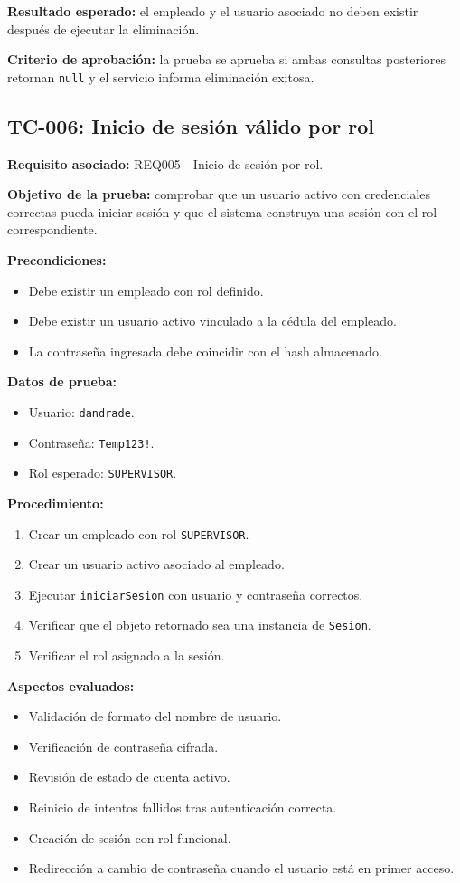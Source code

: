 \documentclass[12pt,a4paper]{article}
\begin{document}
\textbf{Resultado esperado:} el empleado y el usuario asociado no deben existir después de ejecutar la eliminación.

\textbf{Criterio de aprobación:} la prueba se aprueba si ambas consultas posteriores retornan \texttt{null} y el servicio informa eliminación exitosa.

\subsection{TC-006: Inicio de sesión válido por rol}

\textbf{Requisito asociado:} REQ005 - Inicio de sesión por rol.

\textbf{Objetivo de la prueba:} comprobar que un usuario activo con credenciales correctas pueda iniciar sesión y que el sistema construya una sesión con el rol correspondiente.

\textbf{Precondiciones:}
\begin{itemize}[leftmargin=*]
    \item Debe existir un empleado con rol definido.
    \item Debe existir un usuario activo vinculado a la cédula del empleado.
    \item La contraseña ingresada debe coincidir con el hash almacenado.
\end{itemize}

\textbf{Datos de prueba:}
\begin{itemize}[leftmargin=*]
    \item Usuario: \texttt{dandrade}.
    \item Contraseña: \texttt{Temp123!}.
    \item Rol esperado: \texttt{SUPERVISOR}.
\end{itemize}

\textbf{Procedimiento:}
\begin{enumerate}[leftmargin=*]
    \item Crear un empleado con rol \texttt{SUPERVISOR}.
    \item Crear un usuario activo asociado al empleado.
    \item Ejecutar \texttt{iniciarSesion} con usuario y contraseña correctos.
    \item Verificar que el objeto retornado sea una instancia de \texttt{Sesion}.
    \item Verificar el rol asignado a la sesión.
\end{enumerate}

\textbf{Aspectos evaluados:}
\begin{itemize}[leftmargin=*]
    \item Validación de formato del nombre de usuario.
    \item Verificación de contraseña cifrada.
    \item Revisión de estado de cuenta activo.
    \item Reinicio de intentos fallidos tras autenticación correcta.
    \item Creación de sesión con rol funcional.
    \item Redirección a cambio de contraseña cuando el usuario está en primer acceso.
\end{itemize}
\end{document}

